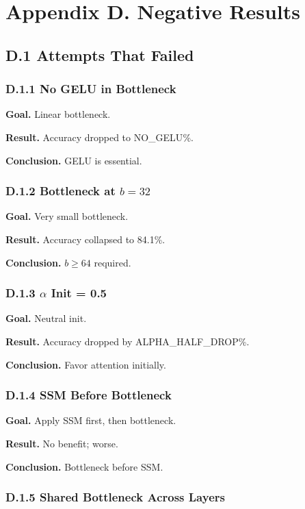\section{Appendix D. Negative Results}

\subsection{D.1 Attempts That Failed}

\subsubsection{D.1.1 No GELU in Bottleneck}

\textbf{Goal.} Linear bottleneck.

\textbf{Result.} Accuracy dropped to {{NO\_GELU}}\%.

\textbf{Conclusion.} GELU is essential.

\subsubsection{D.1.2 Bottleneck at $b = 32$}

\textbf{Goal.} Very small bottleneck.

\textbf{Result.} Accuracy collapsed to 84.1\%.

\textbf{Conclusion.} $b \geq 64$ required.

\subsubsection{D.1.3 $\alpha$ Init = 0.5}

\textbf{Goal.} Neutral init.

\textbf{Result.} Accuracy dropped by {{ALPHA\_HALF\_DROP}}\%.

\textbf{Conclusion.} Favor attention initially.

\subsubsection{D.1.4 SSM Before Bottleneck}

\textbf{Goal.} Apply SSM first, then bottleneck.

\textbf{Result.} No benefit; worse.

\textbf{Conclusion.} Bottleneck before SSM.

\subsubsection{D.1.5 Shared Bottleneck Across Layers}

